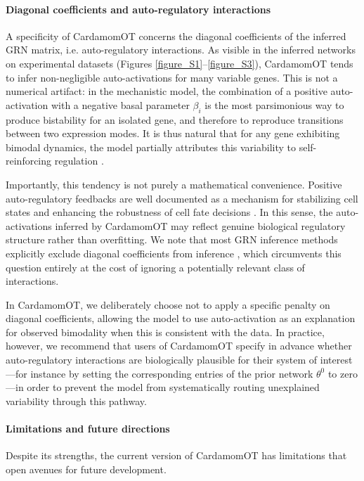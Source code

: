 \documentclass[a4paper, 11pt]{article}
\theoremstyle{plain}
\theoremstyle{remark}
\begin{document}
\paragraph{Diagonal coefficients and auto-regulatory interactions}
A specificity of CardamomOT concerns the diagonal coefficients of the inferred GRN matrix, i.e. auto-regulatory interactions. As visible in the inferred networks on experimental datasets (Figures \ref{figure_S1}--\ref{figure_S3}), CardamomOT tends to infer non-negligible auto-activations for many variable genes. This is not a numerical artifact: in the mechanistic model, the combination of a positive auto-activation with a negative basal parameter $\beta_i$ is the most parsimonious way to produce bistability for an isolated gene, and therefore to reproduce transitions between two expression modes. It is thus natural that for any gene exhibiting bimodal dynamics, the model partially attributes this variability to self-reinforcing regulation \cite{bonnaffoux2019wasabi}.

Importantly, this tendency is not purely a mathematical convenience. Positive auto-regulatory feedbacks are well documented as a mechanism for stabilizing cell states and enhancing the robustness of cell fate decisions \cite{ferrell2002self}. In this sense, the auto-activations inferred by CardamomOT may reflect genuine biological regulatory structure rather than overfitting. We note that most GRN inference methods explicitly exclude diagonal coefficients from inference \cite{sanguinetti2019gene}, which circumvents this question entirely at the cost of ignoring a potentially relevant class of interactions.

In CardamomOT, we deliberately choose not to apply a specific penalty on diagonal coefficients, allowing the model to use auto-activation as an explanation for observed bimodality when this is consistent with the data. In practice, however, we recommend that users of CardamomOT specify in advance whether auto-regulatory interactions are biologically plausible for their system of interest—for instance by setting the corresponding entries of the prior network $\theta^0$ to zero—in order to prevent the model from systematically routing unexplained variability through this pathway.

\paragraph{Limitations and future directions}
Despite its strengths, the current version of CardamomOT has limitations that open avenues for future development.\\
\end{document}
